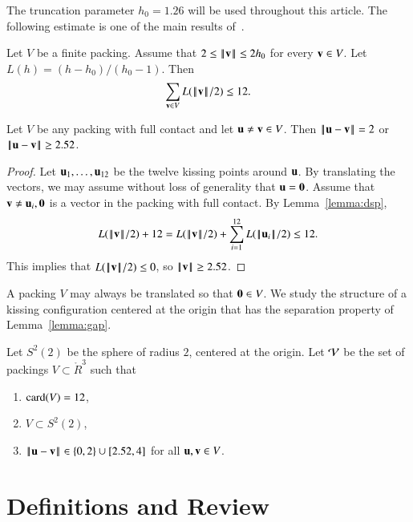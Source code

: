 \documentclass{llncs}
\begin{document}
The truncation parameter $h_0=1.26$ will be used throughout this article.
The following estimate is one of the main results of~\cite{DSP}.

\begin{lemma}\label{lemma:dsp}
Let $V$ be a finite packing.  Assume that $2\le \normo{\v}\le 2h_0$ for
every $\v\in V$.  Let $L(h) = (h-h_0)/(h_0-1)$.  Then
\[
\sum_{\v\in V} L(\normo{\v}/2) \le 12.
\]
\end{lemma}

\begin{lemma} \label{lemma:gap}
  Let $V$ be any packing with full contact and let $\u\ne\v\in V$.
  Then $\norm{\u}{\v}=2$ or $\norm{\u}{\v} \ge 2.52$.
\end{lemma}
%
%

\begin{proof} Let $ \u_1,\ldots, \u_{12}$ be the twelve kissing points
  around $\u$.  By translating the vectors, we may assume without
loss of generality that $\u=\orz$.  Assume that $\v\ne \u_i,\orz$ is  a vector
in the packing with full contact.  By
 Lemma~\ref{lemma:dsp},
\[
   L(\normo{\v}/2)  + 12 
  =  L(\normo{\v}/2) + \sum_{i=1}^{12} L(\normo{\u_i}/2)  \le 12.
\]
This implies that $L(\normo{\v}/2)\le 0$, so $\normo{ \v}\ge 2.52$.
\end{proof}

A packing $V$ may always be translated so that $\orz\in V$.  We study
the structure of a kissing configuration centered at the origin that
has the separation property of Lemma~\ref{lemma:gap}.

\begin{definition}[$S^2(2)$,~$\CalV$]
  Let $S^2(2)$ be the sphere of radius $2$, centered at the origin.  Let
  $\CalV$ be the set of packings $V\subset \ring{R}^3$ such that
\begin{enumerate}\wasitemize 
\item $\card(V) = 12$,
\item $V\subset S^2(2)$,
\item $\norm{\u}{\v} \in \{0,2\}\cup
  \leftclosed2.52,4\rightclosed$ for all $\u,\v\in V$.
\end{enumerate}\wasitemize 
{}%
%
\end{definition}


\section{Definitions and Review}
\end{document}
